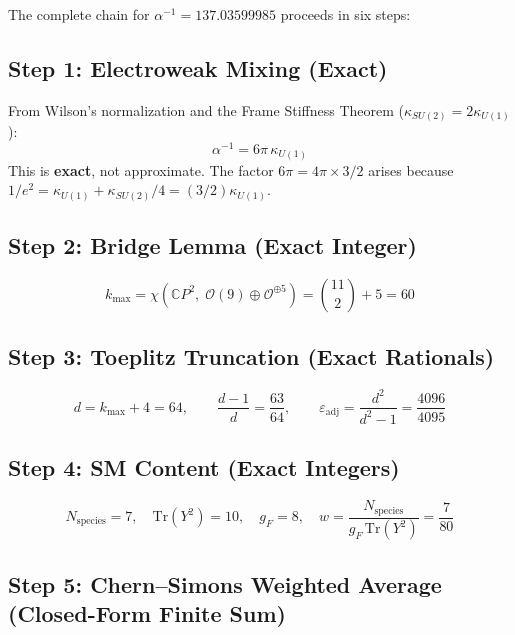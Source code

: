 \documentclass[11pt,a4paper]{article}
\theoremstyle{definition}
\begin{document}
The complete chain for $\alpha^{-1} = 137.03599985$ proceeds in six steps:

\subsection{Step 1: Electroweak Mixing (Exact)}

From Wilson's normalization and the Frame Stiffness Theorem
($\kappa_{SU(2)} = 2\kappa_{U(1)}$):
\begin{equation}\label{eq:master}
\boxed{\alpha^{-1} = 6\pi\,\kappa_{U(1)}}
\end{equation}
This is \textbf{exact}, not approximate.  The factor $6\pi = 4\pi \times 3/2$
arises because $1/e^2 = \kappa_{U(1)} + \kappa_{SU(2)}/4 = (3/2)\kappa_{U(1)}$.

\subsection{Step 2: Bridge Lemma (Exact Integer)}

\begin{equation}
k_{\max} = \chi(\mathbb{C}P^2,\;\mathcal{O}(9) \oplus \mathcal{O}^{\oplus 5})
= \binom{11}{2} + 5 = 60
\end{equation}

\subsection{Step 3: Toeplitz Truncation (Exact Rationals)}

\begin{equation}
d = k_{\max}+4 = 64, \qquad
\frac{d-1}{d} = \frac{63}{64}, \qquad
\varepsilon_{\mathrm{adj}} = \frac{d^2}{d^2-1} = \frac{4096}{4095}
\end{equation}

\subsection{Step 4: SM Content (Exact Integers)}

\begin{equation}
N_{\mathrm{species}} = 7, \quad
\mathrm{Tr}(Y^2) = 10, \quad
g_F = 8, \quad
w = \frac{N_{\mathrm{species}}}{g_F\,\mathrm{Tr}(Y^2)} = \frac{7}{80}
\end{equation}

\subsection{Step 5: Chern--Simons Weighted Average (Closed-Form Finite Sum)}
\end{document}
